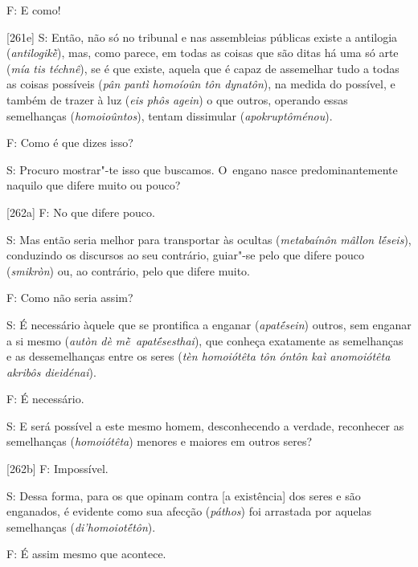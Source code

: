 F: E como!

 

[261e] S: Então, não só no tribunal e nas assembleias públicas
existe a antilogia (\emph{antilogikḕ}), mas, como parece, em todas as
coisas que são ditas há uma só arte (\emph{mía tis téchnê}), se é que
existe, aquela que é capaz de assemelhar tudo a todas as coisas
possíveis (\emph{pân pantì homoíoûn tôn dynatôn}), na medida do
possível, e também de trazer à luz (\emph{eis phôs agein}) o que outros,
operando essas semelhanças (\emph{homoioûntos}), tentam dissimular
(\emph{apokruptôménou}).

 

F: Como é que dizes isso?

 

S: Procuro mostrar"-te isso que buscamos. O~engano nasce
predominantemente naquilo que difere muito ou pouco?

 

[262a] F: No que difere pouco.

 

S: Mas então seria melhor para transportar às ocultas (\emph{metabaínôn
mâllon lḗseis}), conduzindo os discursos ao seu contrário, guiar"-se pelo
que difere pouco (\emph{smikròn}) ou, ao contrário, pelo que difere
muito.

 

F: Como não seria assim?

 

S: É necessário àquele que se prontifica a enganar (\emph{apatḗsein})
outros, sem enganar a si mesmo (\emph{autòn dè mḕ~apatḗsesthai}), que
conheça exatamente as semelhanças e as dessemelhanças entre os seres
(\emph{tèn homoiótêta tôn óntôn kaì anomoiótêta akribôs dieidénai}).

 

F: É necessário.

 

S: E será possível a este mesmo homem, desconhecendo a verdade,
reconhecer as semelhanças (\emph{homoiótêta}) menores e maiores em
outros seres?

 

[262b] F: Impossível.

 

S: Dessa forma, para os que opinam contra [a existência] dos seres e
são enganados, é evidente como sua afecção (\emph{páthos}) foi arrastada
por aquelas semelhanças (\emph{di'homoiotḗtôn}).

 

F: É assim mesmo que acontece.

